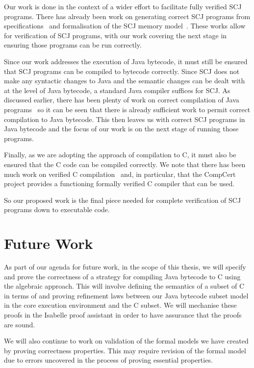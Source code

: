 Our work is done in the context of a wider effort to facilitate fully
verified SCJ programs.
There has already been work on generating correct SCJ programs from
\Circus{} specifications~\cite{cavalcanti2011, cavalcanti2013} and
formalisation of the SCJ memory model~\cite{cavalcanti2011a}.
These works allow for verification of SCJ programs, with our work
covering the next stage in ensuring those programs can be run
correctly.

Since our work addresses the execution of Java bytecode, it must still
be ensured that SCJ programs can be compiled to bytecode correctly.
Since SCJ does not make any syntactic changes to Java and the
semantic changes can be dealt with at the level of Java bytecode, a
standard Java compiler suffices for SCJ.
As discussed earlier, there has been plenty of work on correct
compilation of Java programs~\cite{klein2006, strecker2002,
  lochbihler2010, duran2005, stark2001} so it can be seen that there
is already sufficient work to permit correct compilation to Java
bytecode.
This then leaves us with correct SCJ programs in Java bytecode and the
focus of our work is on the next stage of running those programs.

Finally, as we are adopting the approach of compilation to C, it must
also be ensured that the C code can be compiled correctly.
We note that there has been much work on verified C
compilation~\cite{leroy2009a, leroy2009b, leroy2012, leinenbach2005,
  blazy2006} and, in particular, that the CompCert project provides a
functioning formally verified C compiler that can be used.

So our proposed work is the final piece needed for complete
verification of SCJ programs down to executable code.

\section{Future Work}
\label{future-work-section}

As part of our agenda for future work, in the scope of this thesis, we
will specify and prove the correctness of a strategy for compiling
Java bytecode to C using the algebraic approach.
This will involve defining the semantics of a subset of C in terms of
\Circus{} and proving refinement laws between our Java bytecode subset
model in the core execution environment and the C subset.
We will mechanise these proofs in the Isabelle proof assistant in
order to have assurance that the proofs are sound.

We will also continue to work on validation of the formal models we
have created by proving correctness properties.
This may require revision of the formal model due to errors uncovered
in the process of proving essential properties.

